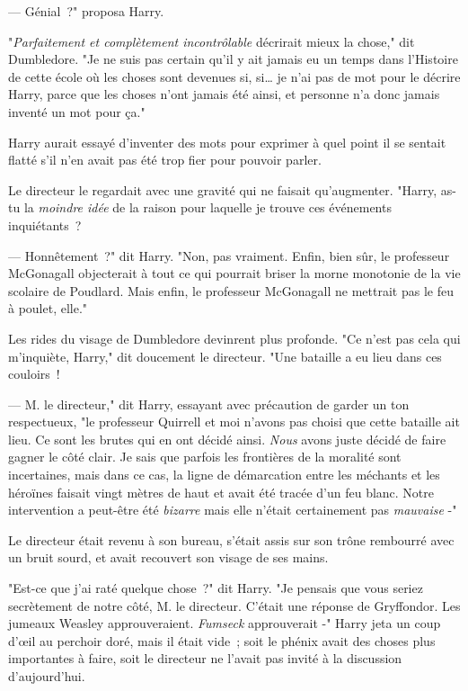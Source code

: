 --- Génial~?" proposa Harry.

"\emph{Parfaitement et complètement incontrôlable} décrirait mieux la chose," dit Dumbledore. "Je ne suis pas certain qu'il y ait jamais eu un temps dans l'Histoire de cette école où les choses sont devenues si, si… je n'ai pas de mot pour le décrire Harry, parce que les choses n'ont jamais été ainsi, et personne n'a donc jamais inventé un mot pour ça."

Harry aurait essayé d'inventer des mots pour exprimer à quel point il se sentait flatté s'il n'en avait pas été trop fier pour pouvoir parler.

Le directeur le regardait avec une gravité qui ne faisait qu'augmenter. "Harry, as-tu la \emph{moindre idée} de la raison pour laquelle je trouve ces événements inquiétants~?

--- Honnêtement~?" dit Harry. "Non, pas vraiment. Enfin, bien sûr, le professeur McGonagall objecterait à tout ce qui pourrait briser la morne monotonie de la vie scolaire de Poudlard. Mais enfin, le professeur McGonagall ne mettrait pas le feu à poulet, elle."

Les rides du visage de Dumbledore devinrent plus profonde. "Ce n'est pas cela qui m'inquiète, Harry," dit doucement le directeur. "Une bataille a eu lieu dans ces couloirs~!

--- M. le directeur," dit Harry, essayant avec précaution de garder un ton respectueux, "le professeur Quirrell et moi n'avons pas choisi que cette bataille ait lieu. Ce sont les brutes qui en ont décidé ainsi. \emph{Nous} avons juste décidé de faire gagner le côté clair. Je sais que parfois les frontières de la moralité sont incertaines, mais dans ce cas, la ligne de démarcation entre les méchants et les héroïnes faisait vingt mètres de haut et avait été tracée d'un feu blanc. Notre intervention a peut-être été \emph{bizarre} mais elle n'était certainement pas \emph{mauvaise} -"

Le directeur était revenu à son bureau, s'était assis sur son trône rembourré avec un bruit sourd, et avait recouvert son visage de ses mains.

"Est-ce que j'ai raté quelque chose~?" dit Harry. "Je pensais que vous seriez secrètement de notre côté, M. le directeur. C'était une réponse de Gryffondor. Les jumeaux Weasley approuveraient. \emph{Fumseck} approuverait -" Harry jeta un coup d'œil au perchoir doré, mais il était vide~; soit le phénix avait des choses plus importantes à faire, soit le directeur ne l'avait pas invité à la discussion d'aujourd'hui.

